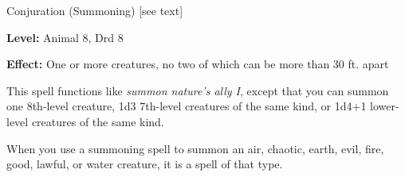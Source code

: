 
Conjuration (Summoning) [see text]

\textbf{Level:} Animal 8, Drd 8

\textbf{Effect:} One or more creatures, no two of which can be more than 30 ft. 
apart

This spell functions like \textit{summon nature's ally I}, except that you can 
summon one 8th-level creature, 1d3 7th-level creatures of the same kind, or 1d4+1 
lower-level creatures of the same kind.

When you use a summoning spell to summon an air, chaotic, earth, evil, fire, good, 
lawful, or water creature, it is a spell of that type.

